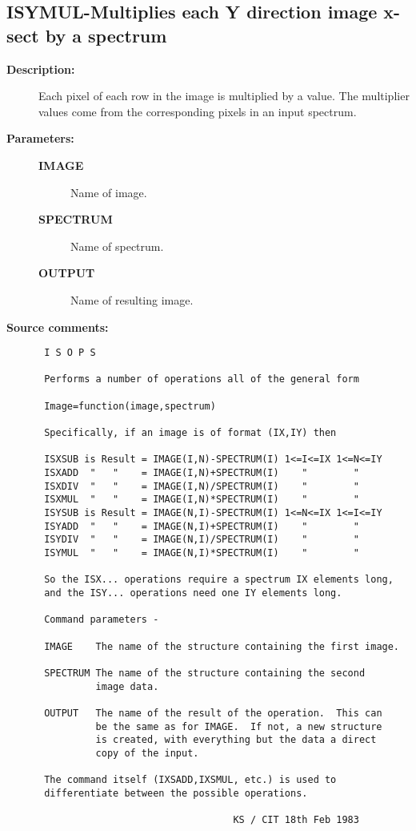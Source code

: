 \subsection{ISYMUL-\label{ISYMUL}Multiplies each Y direction image x-sect by a spectrum}
\begin{description}

\item [{\bf Description:}]
 Each pixel of each row in the image is multiplied by a value.
 The multiplier values come from the corresponding pixels in an
 input spectrum.

\item [{\bf Parameters:}]
\begin{description}
\item [{\bf IMAGE}]
 Name of image.
\item [{\bf SPECTRUM}]
 Name of spectrum.
\item [{\bf OUTPUT}]
 Name of resulting image.
\end{description}

\item [{\bf Source comments:}]
\begin{verbatim}
 I S O P S

 Performs a number of operations all of the general form

 Image=function(image,spectrum)

 Specifically, if an image is of format (IX,IY) then

 ISXSUB is Result = IMAGE(I,N)-SPECTRUM(I) 1<=I<=IX 1<=N<=IY
 ISXADD  "   "    = IMAGE(I,N)+SPECTRUM(I)    "        "
 ISXDIV  "   "    = IMAGE(I,N)/SPECTRUM(I)    "        "
 ISXMUL  "   "    = IMAGE(I,N)*SPECTRUM(I)    "        "
 ISYSUB is Result = IMAGE(N,I)-SPECTRUM(I) 1<=N<=IX 1<=I<=IY
 ISYADD  "   "    = IMAGE(N,I)+SPECTRUM(I)    "        "
 ISYDIV  "   "    = IMAGE(N,I)/SPECTRUM(I)    "        "
 ISYMUL  "   "    = IMAGE(N,I)*SPECTRUM(I)    "        "

 So the ISX... operations require a spectrum IX elements long,
 and the ISY... operations need one IY elements long.

 Command parameters -

 IMAGE    The name of the structure containing the first image.

 SPECTRUM The name of the structure containing the second
          image data.

 OUTPUT   The name of the result of the operation.  This can
          be the same as for IMAGE.  If not, a new structure
          is created, with everything but the data a direct
          copy of the input.

 The command itself (IXSADD,IXSMUL, etc.) is used to
 differentiate between the possible operations.

                                  KS / CIT 18th Feb 1983
\end{verbatim}
\end{description}
